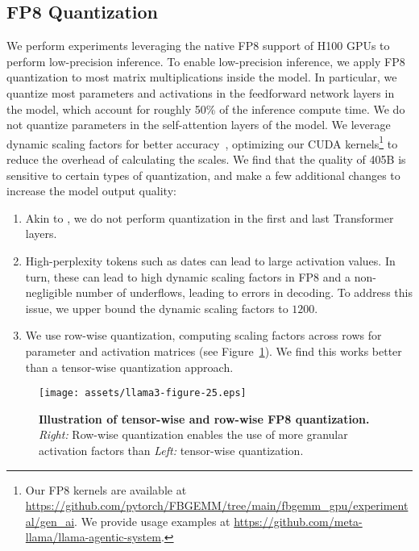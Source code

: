 \subsection{FP8 Quantization}
\label{section:fp8}
We perform experiments leveraging the native FP8 support of H100 GPUs to perform low-precision inference.
To enable low-precision inference, we apply FP8 quantization to most matrix multiplications inside the model.
In particular, we quantize most parameters and activations in the feedforward network layers in the model, which account for roughly 50\% of the inference compute time.
We do not quantize parameters in the self-attention layers of the model.
We leverage dynamic scaling factors for better accuracy~\citep{xiao2024smoothquant}, optimizing our CUDA kernels\footnote{Our FP8 kernels are available at \url{https://github.com/pytorch/FBGEMM/tree/main/fbgemm_gpu/experimental/gen_ai}. We provide usage examples at \url{https://github.com/meta-llama/llama-agentic-system}.} to reduce the overhead of calculating the scales.
We find that the quality of \llamathree 405B is sensitive to certain types of quantization, and make a few additional changes to increase the model output quality:

\begin{enumerate}
    \item Akin to \cite{zhang2021training}, we do not perform quantization in the first and last Transformer layers.
    \item High-perplexity tokens such as dates can lead to large activation values. In turn, these can lead to high dynamic scaling factors in FP8 and a non-negligible number of underflows, leading to errors in decoding. To address this issue, we upper bound the dynamic scaling factors to $1200$.
    \item We use row-wise quantization, computing scaling factors across rows for  parameter and activation matrices (see Figure~\ref{figure:fp8-schematic}). We find this works better than a tensor-wise quantization approach. 
\end{enumerate}

\begin{figure}[t]
\hspace*{-1.2cm}   
\centering
\texttt{[image: assets/llama3-figure-25.eps]}
\caption{\textbf{Illustration of tensor-wise and row-wise FP8 quantization.} \emph{Right:} Row-wise quantization enables the use of more granular activation factors than \emph{Left:} tensor-wise quantization.}
\label{figure:fp8-schematic}
\end{figure}

